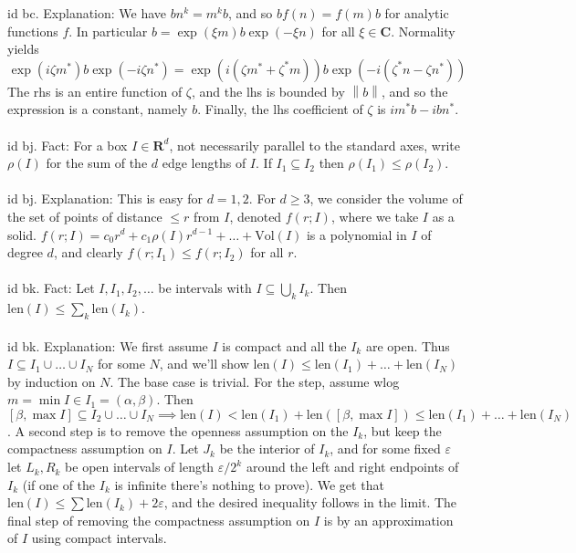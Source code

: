 \documentclass[oneside]{book}
\newcommand{\len}{\mathrm{len}}
\newcommand{\vol}{\mathrm{Vol}}
\newcommand{\sub}{\subseteq}
\newcommand{\eps}{\varepsilon}
\newcommand{\R}{\mathbf{R}}
\newcommand{\C}{\mathbf{C}}
\newcommand{\fit}[1]{\left( #1\right)}
\newcommand{\norm}[1]{\left\lVert #1\right\rVert}
\newcommand{\str}{^*}
\begin{document}
id bc. Explanation: We have $bn^k=m^kb$, and so $bf(n)=f(m)b$ for analytic functions $f$. In particular $b=\exp(\xi m)b\exp(-\xi n)$ for all $\xi\in\C$. Normality yields
$$\exp(i\zeta m\str)b\exp(-i\zeta n\str) = \exp(i(\zeta m\str + \zeta\str m))b\exp(-i(\zeta^* n-\zeta n\str))$$
The rhs is an entire function of $\zeta$, and the lhs is bounded by $\norm{b}$, and so the expression is a constant, namely $b$. Finally, the lhs coefficient of $\zeta$ is $im\str b-ibn\str$. \\\\


id bj. Fact: For a box $I\in\R^d$, not necessarily parallel to the standard axes, write $\rho(I)$ for the sum of the $d$ edge lengths of $I$. If $I_1\sub I_2$ then $\rho(I_1)\le \rho(I_2)$.   \\\\


id bj. Explanation: This is easy for $d=1,2$. For $d\ge 3$, we consider the volume of the set of points of distance $\le r$ from $I$, denoted $f(r;I)$, where we take $I$ as a solid. $f(r;I)=c_0 r^d + c_1\rho(I) r^{d-1}+\dots+\vol(I)$ is a polynomial in $I$ of degree $d$, and clearly $f(r;I_1)\le f(r;I_2)$ for all $r$.  \\\\


id bk. Fact: Let $I,I_1,I_2,\dots$ be intervals with $I\sub\bigcup_{k}I_k$. Then $\len(I)\le\sum_k \len(I_k)$. \\\\


id bk. Explanation: We first assume $I$ is compact and all the $I_k$ are open. Thus $I\sub I_1\cup\dots\cup I_N$ for some $N$, and we'll show $\len(I)\le\len(I_1)+\dots+\len(I_N)$ by induction on $N$. The base case is trivial. For the step, assume wlog $m=\min I\in I_1=(\alpha,\beta)$. Then $[\beta,\max I]\sub I_2\cup\dots\cup I_N\implies \len(I)< \len(I_1)+\len\fit{[\beta,\max I]}\le \len(I_1)+\dots+\len(I_N)$. A second step is to remove the openness assumption on the $I_k$, but keep the compactness assumption on $I$. Let $J_k$ be the interior of $I_k$, and for some fixed $\eps$ let $L_k,R_k$ be open intervals of length $\eps/2^k$ around the left and right endpoints of $I_k$ (if one of the $I_k$ is infinite there's nothing to prove). We get that $\len(I)\le \sum \len(I_k)+2\eps$, and the desired inequality follows in the limit. The final step of removing the compactness assumption on $I$ is by an approximation of $I$ using compact intervals.    \\\\
\end{document}

